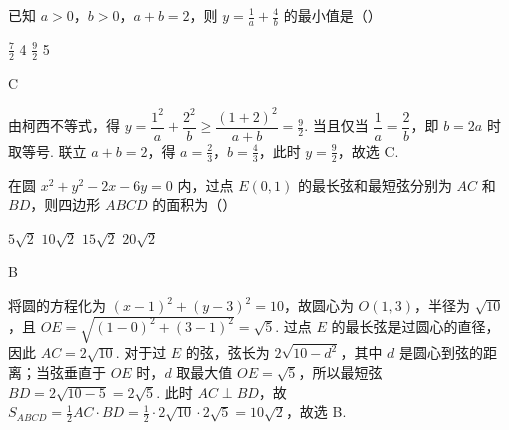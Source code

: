 \begin{problem}
已知 \(a > 0\)，\(b > 0\)，\(a + b = 2\)，则 \(y = \frac{1}{a} + \frac{4}{b}\) 的最小值是（\quad）

\choices
    {\( \frac{7}{2} \)}
    {4}
    {\( \frac{9}{2} \)}
    {5}
\begin{answer}
C
\end{answer}

\begin{solution}
由柯西不等式，得
\(y=\dfrac{1^2}{a}+\dfrac{2^2}{b}\geqslant\dfrac{(1+2)^2}{a+b}=\frac{9}{2}\). 当且仅当 \(\dfrac{1}{a}=\dfrac{2}{b}\)，即 \(b=2a\) 时取等号. 联立 \(a+b=2\)，得 \(a=\frac{2}{3}\)，\(b=\frac{4}{3}\)，此时 \(y=\frac{9}{2}\)，故选 C.
\end{solution}
\end{problem}

\begin{problem}
在圆 \(x^{2} + y^{2} - 2x - 6y = 0\) 内，过点 \(E(0,1)\) 的最长弦和最短弦分别为 \(AC\) 和 \(BD\)，则四边形 \(ABCD\) 的面积为（\quad）

\choices
    {\( 5\sqrt{2} \)}
    {\(10\sqrt{2}\)}
    {\(15\sqrt{2}\)}
    {\(20\sqrt{2}\)}
\begin{answer}
B
\end{answer}

\begin{solution}
将圆的方程化为 \((x-1)^2+(y-3)^2=10\)，故圆心为 \(O(1,3)\)，半径为 \(\sqrt{10}\)，且 \(OE=\sqrt{(1-0)^2+(3-1)^2}=\sqrt{5}\). 过点 \(E\) 的最长弦是过圆心的直径，因此 \(AC=2\sqrt{10}\). 对于过 \(E\) 的弦，弦长为 \(2\sqrt{10-d^2}\)，其中 \(d\) 是圆心到弦的距离；当弦垂直于 \(OE\) 时，\(d\) 取最大值 \(OE=\sqrt{5}\)，所以最短弦 \(BD=2\sqrt{10-5}=2\sqrt{5}\). 此时 \(AC\perp BD\)，故
\(S_{ABCD}=\frac{1}{2}AC\cdot BD=\frac{1}{2}\cdot2\sqrt{10}\cdot2\sqrt{5}=10\sqrt{2}\)，故选 B.
\end{solution}
\end{problem}


